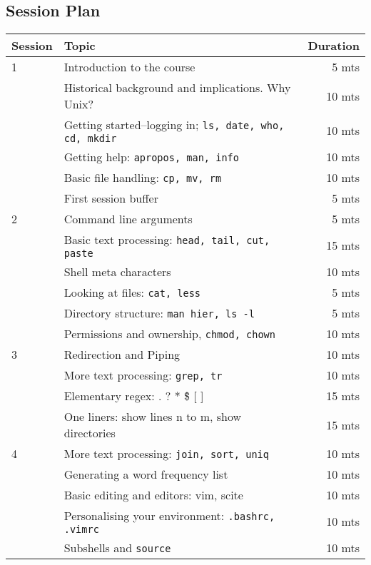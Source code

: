 \documentclass{article}
\begin{document}
\subsection{Session Plan}
\begin{tabular}{llr}
Session & Topic & Duration\\\hline
1 & Introduction to the course                                       & ~5 mts\\
  & Historical background and implications. Why Unix?                & 10 mts\\
  & Getting started--logging in; \tt{ls, date, who, cd, mkdir}       & 10 mts\\
  & Getting help: \tt{apropos, man, info}                            & 10 mts\\
  & Basic file handling: \tt{cp, mv, rm}                             & 10 mts\\
  & First session buffer                                             & ~5 mts\\\hline

2 & Command line arguments                                           & ~5 mts\\
  & Basic text processing: \tt{head, tail, cut, paste}               & 15 mts\\
  & Shell meta characters                                            & 10 mts\\
  & Looking at files: \tt{cat, less}                                 & ~5 mts\\
  & Directory structure: \tt{man hier, ls -l}                        & ~5 mts\\
  & Permissions and ownership, \tt{chmod, chown}                     & 10 mts\\\hline

3 & Redirection and Piping                                           & 10 mts\\
  & More text processing: \tt{grep, tr}                              & 10 mts\\
  & Elementary regex: . ? * \^ \$ [ ]                                  & 15 mts\\
  & One liners: show lines n to m, show directories                  & 15 mts\\\hline

4 & More text processing: \tt{join, sort, uniq}                      & 10 mts\\
  & Generating a word frequency list                                 & 10 mts\\
  & Basic editing and editors: vim, scite                            & 10 mts\\
  & Personalising your environment: \tt{.bashrc, .vimrc}             & 10 mts\\
  & Subshells and \tt{source}                                        & 10 mts\\\hline


\end{tabular}
\end{document}
